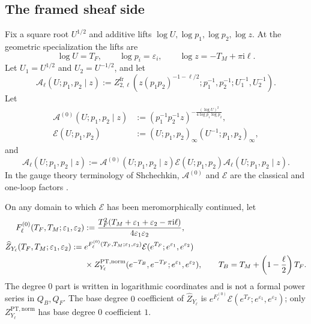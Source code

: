 \documentclass{amsart}
\theoremstyle{definition}
\numberwithin{equation}{section}
\newcommand{\eps}{\varepsilon}
\newcommand{\PT}{\mathrm{PT}}
\begin{document}
\subsection{The framed sheaf side}
Fix a square root \(U^{1/2}\) and additive lifts \(\log U,\log p_1,\log p_2,\log z\).  At the geometric specialization the lifts are
\[
 \log U=T_F,\qquad \log p_i=\eps_i,\qquad \log z=-T_M+\pi\mathrm{i}\ell.
\]
Let \(U_1=U^{1/2}\) and \(U_2=U^{-1/2}\), and let
\begin{equation}
 \mathcal A_\ell(U;p_1,p_2\mid z)
 :=Z_{2,\ell}^{\mathrm{fr}}
 \left(z(p_1p_2)^{-1-\ell/2};
 p_1^{-1},p_2^{-1};U_1^{-1},U_2^{-1}\right).
\label{eq:Hirzebruch-ADHM-series}
\end{equation}
Let
\begin{align}
 \mathcal A^{(0)}(U;p_1,p_2\mid z)
 &:=(p_1^{-1}p_2^{-1}z)^{
 -\frac{(\log U)^2}{4\log p_1\log p_2}},
\label{eq:Hirzebruch-degree-zero-exponential}\\
 \mathcal E(U;p_1,p_2)
 &:=(U;p_1,p_2)_\infty(U^{-1};p_1,p_2)_\infty,
\label{eq:Hirzebruch-Pochhammer-factor}
\end{align}
and
\begin{equation}
\widehat{\mathcal A}_\ell(U;p_1,p_2\mid z)
 :=\mathcal A^{(0)}(U;p_1,p_2\mid z)
   \mathcal E(U;p_1,p_2)
   \mathcal A_\ell(U;p_1,p_2\mid z).
\label{eq:Hirzebruch-completed-ADHM-series}
\end{equation}
In the gauge theory terminology of Shchechkin, \(\mathcal A^{(0)}\) and \(\mathcal E\) are the classical and one-loop factors \cite[equations~(2.15)--(2.16)]{Shchechkin}.

On any domain to which \(\mathcal E\) has been meromorphically continued, let
\begin{align}
 F_\ell^{(0)}(T_F,T_M;\eps_1,\eps_2)
 &:=\frac{T_F^2(T_M+\eps_1+\eps_2-\pi\mathrm{i}\ell)}
 {4\eps_1\eps_2},
\label{eq:Hirzebruch-degree-zero-polynomial}\\
 \widehat Z_{Y_\ell}(T_F,T_M;\eps_1,\eps_2)
 :={}&e^{F_\ell^{(0)}(T_F,T_M;\eps_1,\eps_2)}
 \mathcal E(e^{T_F};e^{\eps_1},e^{\eps_2})\notag\\
 &\times Z_{Y_\ell}^{\PT,\mathrm{norm}}
 (e^{-T_B},e^{-T_F};e^{\eps_1},e^{\eps_2}),
 \qquad T_B=T_M+\left(1-\frac\ell2\right)T_F.
\label{eq:Hirzebruch-full-PT}
\end{align}
The degree \(0\) part is written in logarithmic coordinates and is not a formal power series in \(Q_B,Q_F\).  The base degree \(0\) coefficient of \(\widehat Z_{Y_\ell}\) is \(e^{F_\ell^{(0)}}\mathcal E(e^{T_F};e^{\eps_1},e^{\eps_2})\); only \(Z_{Y_\ell}^{\PT,\mathrm{norm}}\) has base degree \(0\) coefficient \(1\).
\end{document}
